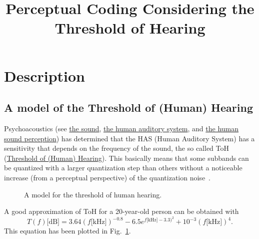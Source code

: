 
\title{Perceptual Coding Considering the Threshold of Hearing}

\maketitle

\section{Description}

\subsection{A model of the Threshold of (Human) Hearing}

Psychoacoustics (see
\href{https://vicente-gonzalez-ruiz.github.io/the_sound/}{the sound},
\href{https://vicente-gonzalez-ruiz.github.io/human_auditory_system/}{the
  human auditory system}, and
\href{https://vicente-gonzalez-ruiz.github.io/human_sound_perception/}{the
  human sound perception}) has determined that the HAS (Human Auditory
System) has a sensitivity that depends on the frequency of the sound,
the so called ToH
(\href{https://en.wikipedia.org/wiki/Absolute_threshold_of_hearing}{Threshold
  of (Human) Hearing}). This basically means that some subbands can be
quantized with a larger quantization step than others without a
noticeable increase (from a perceptual perspective) of the
quantization noise~\cite{sayood2017introduction}.

\begin{figure}
  \centering
  \caption{A model for the threshold of human hearing.}
  \label{fig:ToHH}
\end{figure}

A good approximation of ToH for a 20-year-old person can be
obtained with~\cite{bosi2003intro}
\begin{equation}
  T(f)\text{[dB]} = 3.64(f\text{[kHz]})^{-0.8} - 6.5e^{f\text{[kHz]}-3.3)^2} + 10^{-3}(f\text{[kHz]})^4.
  \label{eq:ToHH}
\end{equation}
This equation has been plotted in Fig.~\ref{fig:ToHH}.

